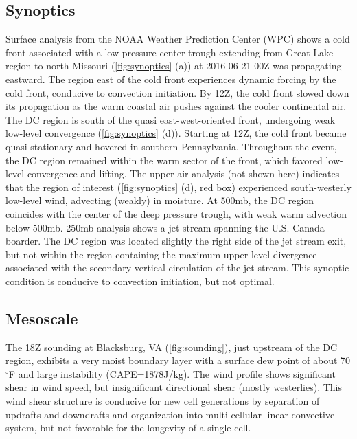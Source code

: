 \subsection{Synoptics}
Surface analysis from the NOAA Weather Prediction Center (WPC) shows a cold front associated with a low pressure center trough extending from Great Lake region to north Missouri (\ref{fig:synoptics} (a)) at 2016-06-21 00Z was propagating eastward. The region east of the cold front experiences dynamic forcing by the cold front, conducive to convection initiation. By 12Z, the cold front slowed down its propagation as the warm coastal air pushes against the cooler continental air. The DC region is south of the quasi east-west-oriented front, undergoing weak low-level convergence (\ref{fig:synoptics} (d)). Starting at 12Z, the cold front became quasi-stationary and hovered  in southern Pennsylvania. Throughout the event, the DC region remained within the warm sector of the front, which favored low-level convergence and lifting. The upper air analysis (not shown here) indicates that the region of interest (\ref{fig:synoptics} (d), red box) experienced south-westerly low-level wind, advecting (weakly) in moisture. At 500mb, the DC region coincides with the center of the deep pressure trough, with weak warm advection below 500mb. 250mb analysis shows a jet stream spanning the U.S.-Canada boarder. The DC region was located slightly the right side of the jet stream exit, but not within the region containing the maximum upper-level divergence associated with the secondary vertical circulation of the jet stream. This synoptic condition is conducive to convection initiation, but not optimal.

\subsection{Mesoscale}
The 18Z sounding at Blacksburg, VA (\ref{fig:sounding}), just upstream of the DC region, exhibits a very moist boundary layer with a surface dew point of about 70$^\circ$F and large instability (CAPE=1878J/kg). The wind profile shows significant shear in wind speed, but insignificant directional shear (mostly westerlies). This wind shear structure is conducive for new cell generations by separation of updrafts and downdrafts and organization into multi-cellular linear convective system, but not favorable for the longevity of a single cell. 

